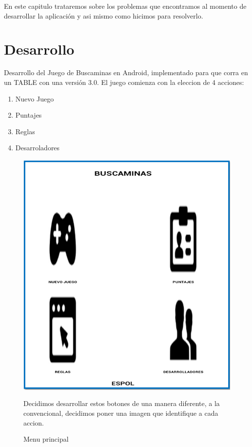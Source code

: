 En este capitulo trataremos sobre los problemas que encontramos al momento de desarrollar la aplicación y asi mismo como hicimos para resolverlo.

\section{Desarrollo}
Desarrollo del Juego de Buscaminas en Android, implementado para que corra en un TABLE con una versión 3.0.
El juego comienza con la eleccion de 4 acciones:
\newline
\newline
\begin{enumerate}
	\item {Nuevo Juego}
	\item {Puntajes}	
	\item{Reglas}
	\item{Desarroladores}
\end{enumerate}
\begin{figure}[htbp]
\begin{center}
\includegraphics[width=.50\textwidth]{./imagenes/menu.png}
\caption{Menu principal}
\end{center}
Decidimos desarrollar estos botones de una manera diferente, a la convencional, decidimos poner una imagen que identifique a cada accion.
\end{figure}



